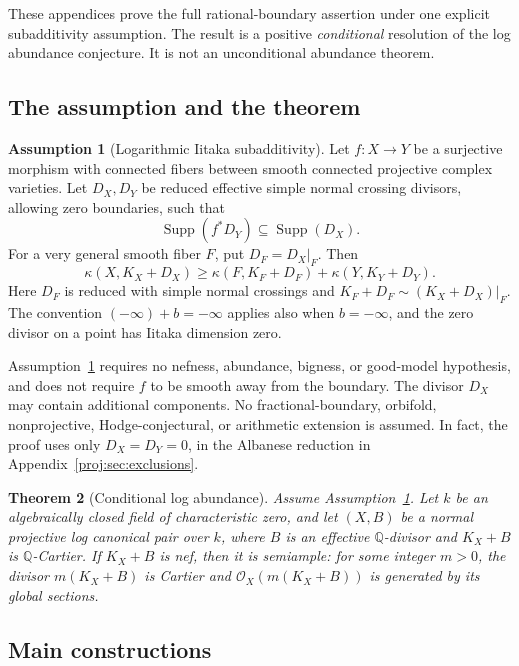 \documentclass[11pt,letterpaper]{article}
\newcommand{\Q}{\mathbb{Q}}
\newcommand{\OO}{\mathcal{O}}
\DeclareMathOperator{\Supp}{Supp}
\newtheorem{theorem}{Theorem}[section]
\theoremstyle{definition}
\newtheorem{assumption}[theorem]{Assumption}
\theoremstyle{remark}
\begin{document}
These appendices prove the full rational-boundary assertion under one
explicit subadditivity assumption. The result is a positive
\emph{conditional} resolution of the log abundance conjecture.
It is not an unconditional abundance theorem.

\subsection{The assumption and the theorem}

\begin{assumption}[Logarithmic Iitaka subadditivity]\label{proj:asm:iitaka}
Let \(f:X\to Y\) be a surjective morphism with connected fibers between
smooth connected projective complex varieties. Let \(D_X,D_Y\) be
reduced effective simple normal crossing divisors, allowing zero
boundaries, such that
\[
  \Supp(f^*D_Y)\subseteq\Supp(D_X).
\]
For a very general smooth fiber \(F\), put \(D_F=D_X|_F\). Then
\[
 \kappa(X,K_X+D_X)\ge
 \kappa(F,K_F+D_F)+\kappa(Y,K_Y+D_Y).
\]
Here \(D_F\) is reduced with simple normal crossings and
\(K_F+D_F\sim(K_X+D_X)|_F\). The convention
\((-\infty)+b=-\infty\) applies also when \(b=-\infty\), and the zero
divisor on a point has Iitaka dimension zero.
\end{assumption}

Assumption~\ref{proj:asm:iitaka} requires no nefness, abundance, bigness,
or good-model hypothesis, and does not require \(f\) to be smooth
away from the boundary. The divisor \(D_X\) may contain additional
components. No fractional-boundary,
orbifold, nonprojective, Hodge-conjectural, or arithmetic extension is
assumed. In fact, the proof uses only \(D_X=D_Y=0\), in the Albanese
reduction in Appendix~\ref{proj:sec:exclusions}.

\begin{theorem}[Conditional log abundance]\label{proj:thm:main}\label{proj:main}\label{proj:conditional-log-abundance}
Assume Assumption~\ref{proj:asm:iitaka}. Let \(k\) be an algebraically closed
field of characteristic zero, and let \((X,B)\) be a normal projective log
canonical pair over \(k\), where \(B\) is an effective \(\Q\)-divisor
and \(K_X+B\) is \(\Q\)-Cartier. If \(K_X+B\) is nef, then it is
semiample: for some integer \(m>0\), the divisor \(m(K_X+B)\) is
Cartier and \(\OO_X(m(K_X+B))\) is generated by its global sections.
\end{theorem}

\subsection{Main constructions}
\end{document}
